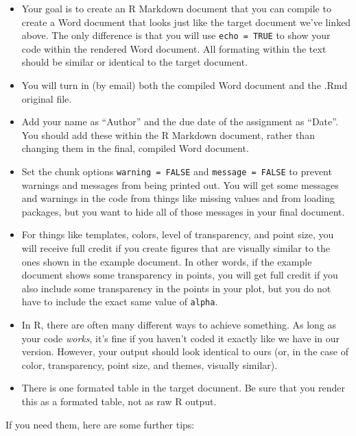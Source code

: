 \documentclass[]{book}
\providecommand{\tightlist}{%
  \setlength{\itemsep}{0pt}\setlength{\parskip}{0pt}}
\theoremstyle{definition}
\theoremstyle{definition}
\theoremstyle{definition}
\theoremstyle{remark}
\begin{document}
\begin{itemize}
\tightlist
\item
  Your goal is to create an R Markdown document that you can compile to
  create a Word document that looks just like the target document we've
  linked above. The only difference is that you will use
  \texttt{echo\ =\ TRUE} to show your code within the rendered Word
  document. All formating within the text should be similar or identical
  to the target document.\\
\item
  You will turn in (by email) both the compiled Word document and the
  .Rmd original file.
\item
  Add your name as ``Author'' and the due date of the assignment as
  ``Date''. You should add these within the R Markdown document, rather
  than changing them in the final, compiled Word document.
\item
  Set the chunk options \texttt{warning\ =\ FALSE} and
  \texttt{message\ =\ FALSE} to prevent warnings and messages from being
  printed out. You will get some messages and warnings in the code from
  things like missing values and from loading packages, but you want to
  hide all of those messages in your final document.
\item
  For things like templates, colors, level of transparency, and point
  size, you will receive full credit if you create figures that are
  visually similar to the ones shown in the example document. In other
  words, if the example document shows some transparency in points, you
  will get full credit if you also include some transparency in the
  points in your plot, but you do not have to include the exact same
  value of \texttt{alpha}.
\item
  In R, there are often many different ways to achieve something. As
  long as your code \emph{works}, it's fine if you haven't coded it
  exactly like we have in our version. However, your output should look
  identical to ours (or, in the case of color, transparency, point size,
  and themes, visually similar).
\item
  There is one formated table in the target document. Be sure that you
  render this as a formated table, not as raw R output.
\end{itemize}

If you need them, here are some further tips:
\end{document}
